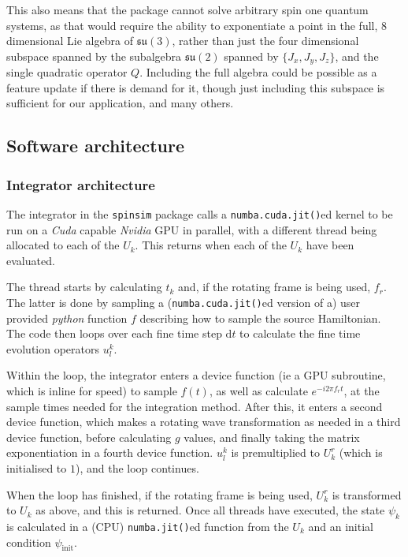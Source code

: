 \documentclass{jors}
\begin{document}
			This also means that the package cannot solve arbitrary spin one quantum systems, as that would require the ability to exponentiate a point in the full, 8 dimensional Lie algebra of \(\mathfrak{su}(3)\), rather than just the four dimensional subspace spanned by the subalgebra \(\mathfrak{su}(2)\) spanned by \(\{J_x, J_y, J_z\}\), and the single quadratic operator \(Q\). Including the full algebra could be possible as a feature update if there is demand for it, though just including this subspace is sufficient for our application, and many others.

	\subsection*{Software architecture}
		\subsubsection*{Integrator architecture}
			The integrator in the \texttt{spinsim} package calls a \texttt{numba.cuda.jit()}ed kernel to be run on a \emph{Cuda} capable \emph{Nvidia} GPU in parallel, with a different thread being allocated to each of the \(U_k\). This returns when each of the \(U_k\) have been evaluated.
			
			The thread starts by calculating \(t_k\) and, if the rotating frame is being used, \(f_r\). The latter is done by sampling a (\texttt{numba.cuda.jit()}ed version of a) user provided \emph{python} function \(f\) describing how to sample the source Hamiltonian. The code then loops over each fine time step \(\mathrm{d}t\) to calculate the fine time evolution operators \(u^k_l\).
			
			Within the loop, the integrator enters a device function (ie a GPU subroutine, which is inline for speed) to sample \(f(t)\), as well as calculate \(e^{-i 2 \pi f_r t}\), at the sample times needed for the integration method. After this, it enters a second device function, which makes a rotating wave transformation as needed in a third device function, before calculating \(g\) values, and finally taking the matrix exponentiation in a fourth device function. \(u^k_l\) is premultiplied to \(U^r_k\) (which is initialised to \(1\)), and the loop continues.
			
			When the loop has finished, if the rotating frame is being used, \(U^r_k\) is transformed to \(U_k\) as above, and this is returned. Once all threads have executed, the state \(\psi_k\) is calculated in a (CPU) \texttt{numba.jit()}ed function from the \(U_k\) and an initial condition \(\psi_{\mathrm{init}}\).
	
\end{document}

